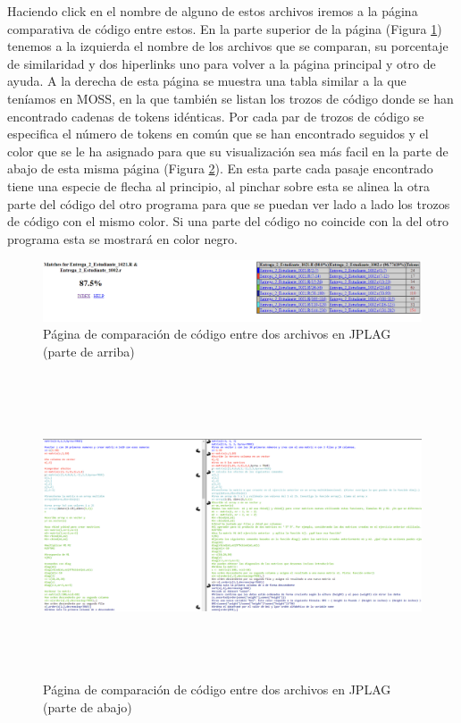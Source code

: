 Haciendo click en el nombre de alguno de estos archivos iremos a la página comparativa de código entre estos.
\newline
En la parte superior de la página (Figura \ref{fig:entrega2_JPLAG_3}) tenemos a la izquierda el nombre de los archivos que se comparan, su porcentaje de similaridad y dos hiperlinks uno para volver a la página principal y otro de ayuda. A la derecha de esta página se muestra una tabla similar a la que teníamos en MOSS, en la que también se listan los trozos de código donde se han encontrado cadenas de tokens idénticas. Por cada par de trozos de código se especifica el número de tokens en común que se han encontrado seguidos y el color que se le ha asignado para que su visualización sea más facil en la parte de abajo de esta misma página (Figura \ref{fig:entrega2_JPLAG_4}).
\newline
En esta parte cada pasaje encontrado tiene una especie de flecha al principio, al pinchar sobre esta se alinea la otra parte del código del otro programa para que se puedan ver lado a lado los trozos de código con el mismo color.
Si una parte del código no coincide con la del otro programa esta se mostrará en color negro.


\begin{figure}[H] %
\centering
\includegraphics[scale=0.3]{imagenes/entrega2_JPLAG_3.png}  %
\caption{Página de comparación de código entre dos archivos en JPLAG (parte de arriba)} \label{fig:entrega2_JPLAG_3}
\end{figure}


\begin{figure}[H] %
\centering
\includegraphics[width=14cm, height=9cm]{imagenes/entrega2_JPLAG_4.png}  %
\caption{Página de comparación de código entre dos archivos en JPLAG (parte de abajo)} \label{fig:entrega2_JPLAG_4}
\end{figure}


